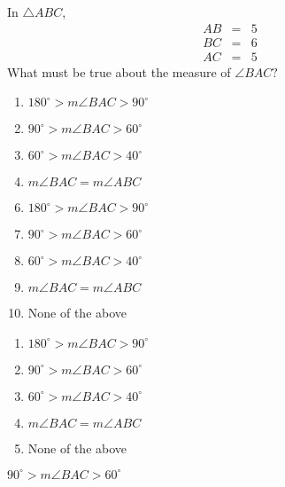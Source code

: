 









  In $\triangle ABC$, 
\[\begin{array}{ccc}

AB &=& 5\\
BC &=& 6\\
AC &=& 5
\end{array}\]
What must be true about the measure of $\angle BAC?$


\ifsat
	\begin{enumerate}[label=\Alph*)]
		\item   $180^\circ> m\angle BAC > 90 ^\circ$
		\item   $90^\circ >m\angle BAC > 60 ^\circ$ %
		\item  $60^\circ> m\angle BAC > 40 ^\circ$ 
		\item  $m\angle BAC= m\angle ABC$
	\end{enumerate}
\else
\fi

\ifacteven
	\begin{enumerate}[label=\textbf{\Alph*.},itemsep=\fill,align=left]
		\setcounter{enumii}{5}
		\item   $180^\circ> m\angle BAC > 90 ^\circ$
		\item   $90^\circ >m\angle BAC > 60 ^\circ$ %
		\item  $60^\circ> m\angle BAC > 40 ^\circ$ 
		\addtocounter{enumii}{1}
		\item  $m\angle BAC= m\angle ABC$
		\item  None of the above
	\end{enumerate}
\else
\fi

\ifactodd
	\begin{enumerate}[label=\textbf{\Alph*.},itemsep=\fill,align=left]
		\item   $180^\circ> m\angle BAC > 90 ^\circ$
		\item   $90^\circ >m\angle BAC > 60 ^\circ$ %
		\item  $60^\circ> m\angle BAC > 40 ^\circ$ 
		\item  $m\angle BAC= m\angle ABC$
		\item  None of the above
	\end{enumerate}
\else
\fi

\ifgridin
   $90^\circ >m\angle BAC > 60 ^\circ$ %
		
\else
\fi

